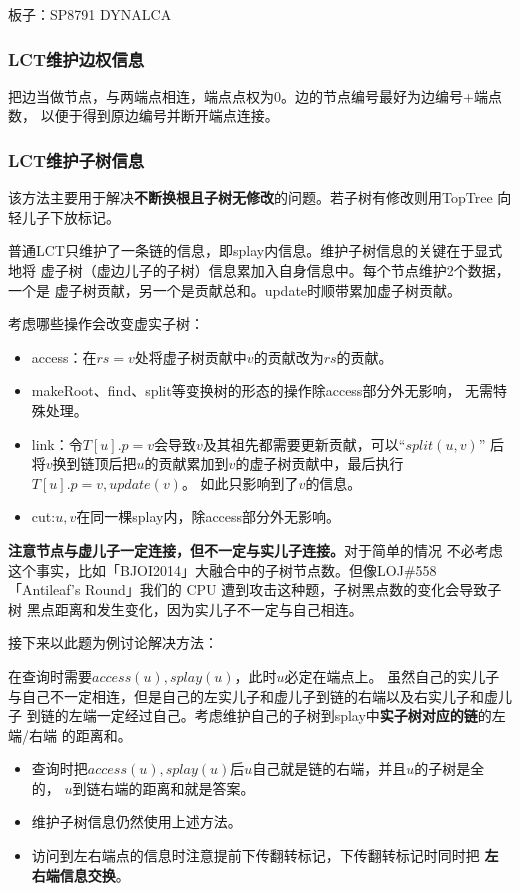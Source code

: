 板子：SP8791 DYNALCA

\subsubsection{LCT维护边权信息}
把边当做节点，与两端点相连，端点点权为0。边的节点编号最好为边编号+端点数，
以便于得到原边编号并断开端点连接。
\subsubsection{LCT维护子树信息}
该方法主要用于解决{\bfseries 不断换根且子树无修改}的问题。若子树有修改则用TopTree
向轻儿子下放标记。

普通LCT只维护了一条链的信息，即splay内信息。维护子树信息的关键在于显式地将
虚子树（虚边儿子的子树）信息累加入自身信息中。每个节点维护2个数据，一个是
虚子树贡献，另一个是贡献总和。update时顺带累加虚子树贡献。

考虑哪些操作会改变虚实子树：
\begin{itemize}
    \item access：在$rs=v$处将虚子树贡献中$v$的贡献改为$rs$的贡献。
    \item makeRoot、find、split等变换树的形态的操作除access部分外无影响，
    无需特殊处理。
    \item link：令$T[u].p=v$会导致$v$及其祖先都需要更新贡献，可以``$split(u,v)$''
    后将$v$换到链顶后把$u$的贡献累加到$v$的虚子树贡献中，最后执行$T[u].p=v,update(v)$。
    如此只影响到了$v$的信息。
    \item cut:$u,v$在同一棵splay内，除access部分外无影响。
\end{itemize}

{\bfseries 注意节点与虚儿子一定连接，但不一定与实儿子连接。}对于简单的情况
不必考虑这个事实，比如「BJOI2014」大融合中的子树节点数。但像LOJ\#558
「Antileaf's Round」我们的 CPU 遭到攻击这种题，子树黑点数的变化会导致子树
黑点距离和发生变化，因为实儿子不一定与自己相连。

接下来以此题为例讨论解决方法：

在查询时需要$access(u),splay(u)$，此时$u$必定在端点上。
虽然自己的实儿子与自己不一定相连，但是自己的左实儿子和虚儿子到链的右端以及右实儿子和虚儿子
到链的左端一定经过自己。考虑维护自己的子树到splay中{\bfseries 实子树对应的链}的左端/右端
的距离和。
\begin{itemize}
    \item 查询时把$access(u),splay(u)$后$u$自己就是链的右端，并且$u$的子树是全的，
    $u$到链右端的距离和就是答案。
    \item 维护子树信息仍然使用上述方法。
    \item 访问到左右端点的信息时注意提前下传翻转标记，下传翻转标记时同时把{\bfseries
    左右端信息交换}。
\end{itemize}

